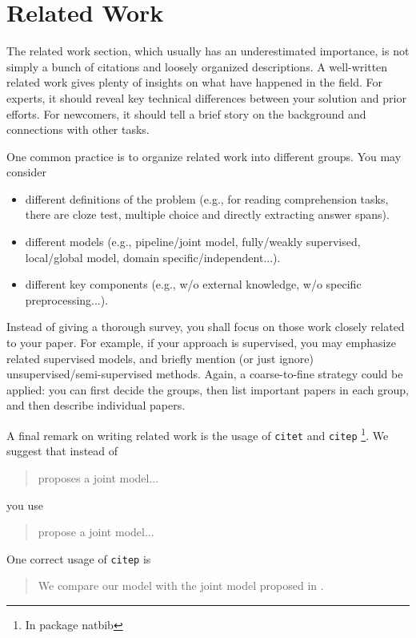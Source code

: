 \section{Related Work}

The related work section, which usually has an underestimated importance,
is not simply a bunch of citations and loosely organized descriptions.
A well-written related work gives plenty of insights 
on what have happened in the field.
For experts, it should reveal key technical differences 
between your solution and prior efforts.
For newcomers,
it should tell a brief story on the background 
and connections with other tasks.

One common practice is to organize related work into different groups.  
You may consider
\begin{itemize}
    \item different definitions of the problem 
    (e.g., for reading comprehension tasks, there are
     cloze test, multiple choice and directly extracting answer spans).
    \item different models
    (e.g., pipeline/joint model, fully/weakly supervised,
     local/global model, domain specific/independent...).
    \item different key components 
    (e.g., w/o external knowledge, w/o specific preprocessing...).
\end{itemize}
Instead of giving a thorough survey, 
you shall focus on those work closely related to your paper. 
For example, if your approach is supervised,
you may emphasize related supervised models,
and briefly mention (or just ignore) unsupervised/semi-supervised methods.
Again, a coarse-to-fine strategy could be applied:
you can first decide the groups, then list important papers in each group,
and then describe individual papers.


A final remark on writing related work is the usage of \texttt{citet} and 
\texttt{citep}
\footnote{In package natbib}.
We suggest that instead of 
\begin{quote}
\citep{miwa-sasaki:2014:EMNLP2014} proposes a joint model...
\end{quote}
you use
\begin{quote}
\citet{miwa-sasaki:2014:EMNLP2014} propose a joint model...
\end{quote}
One correct usage of \texttt{citep} is 
\begin{quote}
We compare our model with the joint model proposed in 
\citep{miwa-sasaki:2014:EMNLP2014}.
\end{quote}




